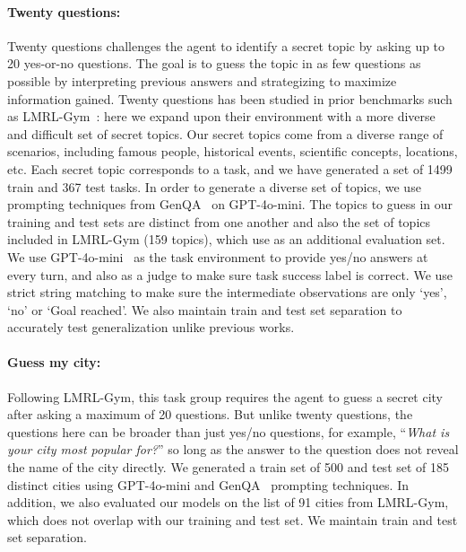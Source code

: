 \documentclass{article}
\theoremstyle{plain}
\theoremstyle{definition}
\theoremstyle{remark}
\begin{document}
\paragraph{Twenty questions: }
Twenty questions challenges the agent to identify a secret topic by asking up to 20 yes-or-no questions. The goal is to guess the topic in as few questions as possible by interpreting previous answers and strategizing to maximize information gained. Twenty questions has been studied in prior benchmarks such as LMRL-Gym~\citep{abdulhai2023lmrl}: here we expand upon their environment with a more diverse and difficult set of secret topics. Our secret topics come from a diverse range of scenarios, including famous people, historical events, scientific concepts, locations, etc. Each secret topic corresponds to a task, and we have generated a set of 1499 train and 367 test tasks. In order to generate a diverse set of topics, we use prompting techniques from GenQA~\citep{chen2024genqageneratingmillionsinstructions} on GPT-4o-mini. The topics to guess in our training and test sets are distinct from one another and also the set of topics included in LMRL-Gym (159 topics), which use as an additional evaluation set. We use GPT-4o-mini~\citep{hurst2024gpt,openai2024gpt4technicalreport} as the task environment to provide yes/no answers at every turn, and also as a judge to make sure task success label is correct. We use strict string matching to make sure the intermediate observations are only `yes', `no' or `Goal reached'. We also maintain train and test set separation to accurately test generalization unlike previous works.
\paragraph{Guess my city: } Following LMRL-Gym, this task group requires the agent to guess a secret city after asking a maximum of 20 questions.
But unlike twenty questions, the questions here can be broader than just yes/no questions, for example, ``\emph{What is your city most popular for?}'' so long as the answer to the question does not reveal the name of the city directly. We generated a train set of 500 and test set of 185 distinct cities using GPT-4o-mini and GenQA~\citep{chen2024genqageneratingmillionsinstructions} prompting techniques. In addition, we also evaluated our models on the list of 91 cities from LMRL-Gym, which does not overlap with our training and test set. We maintain train and test set separation.
\end{document}
